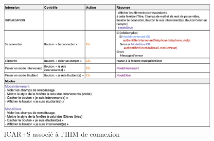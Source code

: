 \begin{figure}[H]
    \centering
    \includegraphics[width=13cm]{ICARS/connexion.png}
    \caption{ICAR+S associé à l'IHM de connexion}
\end{figure}

